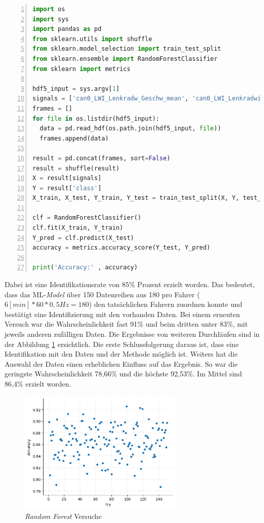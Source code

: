 \begin{lstlisting}[frame=lines, caption=Erster Versuch mit \textit{Random Forest}, captionpos=b, label = lst:rf_first_try, numbers=left, language=Python, showstringspaces=false, basicstyle=\footnotesize]
import os
import sys
import pandas as pd
from sklearn.utils import shuffle
from sklearn.model_selection import train_test_split
from sklearn.ensemble import RandomForestClassifier
from sklearn import metrics

hdf5_input = sys.argv[1]
signals = ['can0_LWI_Lenkradw_Geschw_mean', 'can0_LWI_Lenkradwinkel_mean', ...]
frames = []
for file in os.listdir(hdf5_input):
  data = pd.read_hdf(os.path.join(hdf5_input, file))
  frames.append(data)

result = pd.concat(frames, sort=False)
result = shuffle(result)
X = result[signals]
Y = result['class']
X_train, X_test, Y_train, Y_test = train_test_split(X, Y, test_size=0.3)

clf = RandomForestClassifier()
clf.fit(X_train, Y_train)
Y_pred = clf.predict(X_test)
accuracy = metrics.accuracy_score(Y_test, Y_pred)

print('Accuracy:' , accuracy)
\end{lstlisting}

Dabei ist eine Identifikationsrate von 85\% Prozent erzielt worden. Das bedeutet, dass das ML-\textit{Model} über 150 Datenreihen aus 180 pro Fahrer ($6[min] * 60 * 0,5Hz = 180$) den tatsächlichen Fahrern zuordnen konnte und bestätigt eine Identifizierung mit den vorhanden Daten. Bei einem erneuten Versuch war die Wahrscheinlichkeit fast 91\% und beim dritten unter 83\%, mit jeweils anderen zufälligen Daten. Die Ergebnisse von weiteren Durchläufen sind in der Abbildung \ref{fig:rf_tries} ersichtlich. Die erste Schlussfolgerung daraus ist, dass eine Identifikation mit den Daten und der Methode möglich ist. Weiters hat die Auswahl der Daten einen erheblichen Einfluss auf das Ergebnis. So war die geringste Wahrscheinlichkeit 78,66\% und die höchste 92,53\%. Im Mittel sind 86,4\% erzielt worden.

\begin{figure}[htbp]
	\centering
		\includegraphics[width=0.7\textwidth]{images/rf_accuracy.png}
	\caption{\textit{Random Forest} Versuche}
	\label{fig:rf_tries}
\end{figure}
